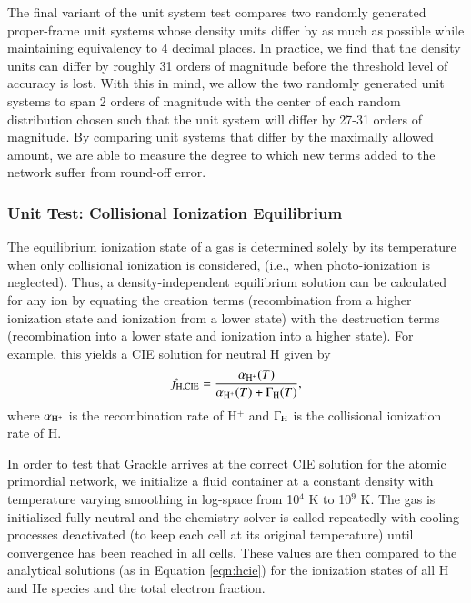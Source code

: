 The final variant of the unit system test compares two randomly
generated proper-frame unit systems whose density units differ by as
much as possible while maintaining equivalency to 4 decimal places.
In practice, we find that the density units can differ by roughly 31
orders of magnitude before the threshold level of accuracy is lost.
With this in mind, we allow the two randomly generated unit systems to
span 2 orders of magnitude with the center of each random distribution
chosen such that the unit system will differ by 27-31 orders of
magnitude.  By comparing unit systems that differ by the maximally
allowed amount, we are able to measure the degree to which new terms
added to the network suffer from round-off error.

\subsubsection{Unit Test: Collisional Ionization Equilibrium}
\label{sec:test-cie}

The equilibrium ionization state of a gas is determined solely by its
temperature when only collisional ionization is considered, (i.e.,
when photo-ionization is neglected).  Thus, a density-independent
equilibrium solution can be calculated for any ion by equating the
creation terms (recombination from a higher ionization state and 
ionization from a lower state) with the destruction terms
(recombination into a lower state and ionization into a higher
state).  For example, this yields a CIE solution for neutral H given
by
\begin{equation} \label{eqn:hcie}
f_{\rm H,CIE} = \frac{\alpha_{\rm H^{+}}(T)}{\alpha_{\rm H^{+}}(T) +
  \Gamma_{\rm H}(T)},
\end{equation}
where $\alpha_{\rm H^{+}}$ is the recombination rate of H$^{+}$ and
$\Gamma_{\rm H}$ is the collisional ionization rate of H.

In order to test that Grackle arrives at the correct CIE solution
for the atomic primordial network, we initialize a fluid container at
a constant density with temperature varying smoothing in log-space
from 10$^{4}$ K to 10$^{9}$ K.  The gas is initialized fully neutral
and the chemistry solver is called repeatedly with cooling processes
deactivated (to keep each cell at its original temperature) until
convergence has been reached in all cells.  These values are then
compared to the analytical solutions (as in Equation \ref{eqn:hcie})
for the ionization states of all H and He species and the total
electron fraction.

